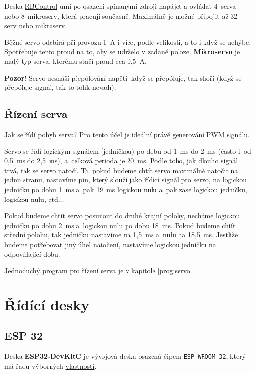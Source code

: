 Deska \hyperref[rbcontrol]{RBControl} umí po osazení spínanými zdroji napájet a ovládat 4~serva nebo 8~mikroserv, která pracují současně.
Maximálně je možné připojit až 32 serv nebo mikroserv. 

Běžné servo odebírá při provozu 1~A i více, podle velikosti, a to i když se nehýbe. Spotřebuje tento proud na to, aby se udrželo v zadané poloze. 
\textbf{Mikroservo} je malý typ serva, kterému stačí proud cca 0,5~A.  \label{mikroservo} %

{\bf Pozor!} Servo nesnáší přepólování napětí, když se přepóluje, tak shoří (když se přepóluje signál, tak to tolik nevadí).

\subsection{Řízení serva}

 Jak se řídí pohyb serva? Pro tento účel je ideální právě generování PWM signálu. 

Servo se řídí logickým signálem (jedničkou) po dobu od 1~ms do 2~ms (často i~od 0,5~ms do 2,5~ms), 
a~celková perioda je 20~ms. Podle toho, jak dlouho signál trvá, tak se servo natočí. 
Tj. pokud budeme chtít servo maximálně natočit na jednu stranu, nastavíme pin, který 
slouží jako řídící signál pro servo, na logickou jedničku po dobu 1~ms a~pak 19~ms logickou nulu a~pak zase logickou jedničku, logickou nulu, atd... 

Pokud budeme chtít servo posunout do druhé krajní polohy, necháme logickou jedničku po dobu 2~ms a~logickou nulu po dobu 18~ms. 
Pokud budeme chtít střední polohu, tak jedničku nastavíme na 1,5~ms a~nulu na 18,5~ms. 
Jestliže budeme potřebovat jiný úhel natočení, nastavíme logickou jedničku na odpovídající dobu.

Jednoduchý program pro řízení serva je v kapitole \ref{prog:servo}.


\section{Řídící desky} \label{ridici_desky}

 \subsection{ESP 32} \label{esp32}

Deska {\bf ESP32-DevKitC}  je vývojová deska osazená čipem {\tt ESP-WROOM-32}, který má řadu výborných \href{https://en.wikipedia.org/wiki/ESP32}{vlastností}.

